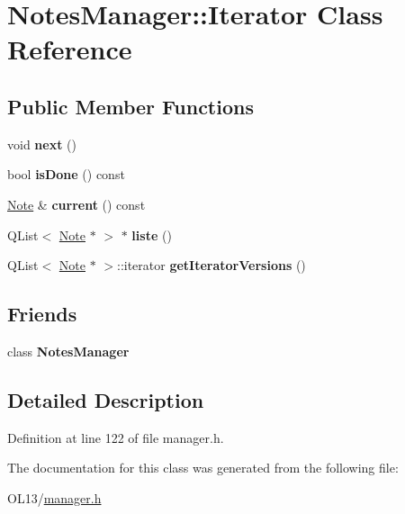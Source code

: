 \hypertarget{class_notes_manager_1_1_iterator}{}\section{Notes\+Manager\+:\+:Iterator Class Reference}
\label{class_notes_manager_1_1_iterator}
\subsection*{Public Member Functions}
\begin{DoxyCompactItemize}
\item 
\mbox{\label{class_notes_manager_1_1_iterator_a1a79699fe56e691c3f1c72eb46703fc6}} 
void {\bfseries next} ()
\item 
\mbox{\label{class_notes_manager_1_1_iterator_ab9afd283687410c5591f97881ac17b29}} 
bool {\bfseries is\+Done} () const
\item 
\mbox{\label{class_notes_manager_1_1_iterator_aaf695d1b7faf4afa9a36115f5e9d3547}} 
\hyperlink{class_note}{Note} \& {\bfseries current} () const
\item 
\mbox{\label{class_notes_manager_1_1_iterator_ab64667e5cf5e2285761c6eaa12797a83}} 
Q\+List$<$ \hyperlink{class_note}{Note} $\ast$ $>$ $\ast$ {\bfseries liste} ()
\item 
\mbox{\label{class_notes_manager_1_1_iterator_ab0cfae90dcf5788e37f4bf84f5c58093}} 
Q\+List$<$ \hyperlink{class_note}{Note} $\ast$ $>$\+::iterator {\bfseries get\+Iterator\+Versions} ()
\end{DoxyCompactItemize}
\subsection*{Friends}
\begin{DoxyCompactItemize}
\item 
\mbox{\label{class_notes_manager_1_1_iterator_a017a5144e8cfa6087305055ab968ef41}} 
class {\bfseries Notes\+Manager}
\end{DoxyCompactItemize}


\subsection{Detailed Description}


Definition at line 122 of file manager.\+h.



The documentation for this class was generated from the following file\+:\begin{DoxyCompactItemize}
\item 
O\+L13/\hyperlink{manager_8h}{manager.\+h}\end{DoxyCompactItemize}
